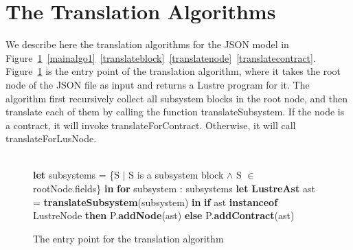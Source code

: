 \documentclass{article}
\begin{document}
\section{The Translation Algorithms}

We describe here the translation algorithms for the JSON model in Figure~\ref{mainalgo}~\ref{mainalgo1}~\ref{translateblock}~\ref{translatenode}~\ref{translatecontract}.
Figure~\ref{mainalgo} is the entry point of the translation algorithm, where it takes the root node of the JSON file as input and returns a Lustre program for it.
The algorithm first recursively collect all subsystem blocks in the root node, and then translate each of them by calling the function \textsf{translateSubsystem}. 
If the node is a contract, it will invoke \textsf{translateForContract}.
Otherwise, it will call \textsf{translateForLusNode}.


\begin{figure}
\begin{algorithmic}
\\
\State \textbf{let} subsystems = \{S $\mid$ S is a subsystem block $\land$ S $\in$ rootNode.fields\} \textbf{in}
\State \textbf{for} subsystem : subsystems
\State {\ \ \ \ } \textbf{let} \textbf{LustreAst} ast = \textbf{translateSubsystem}(subsystem) \textbf{in}
\State {\ \ \ \ } \textbf{if}  ast \textbf{instanceof} LustreNode \textbf{then}
\State {\ \ \ \ \ \ \ \ } P.\textbf{addNode}(ast)
\State {\ \ \ \ } \textbf{else}
\State {\ \ \ \ \ \ \ \ } P.\textbf{addContract}(ast)
\EndFunction
\end{algorithmic}
\label{mainalgo}
\caption{The entry point for the translation algorithm}
\end{figure}
\end{document}
